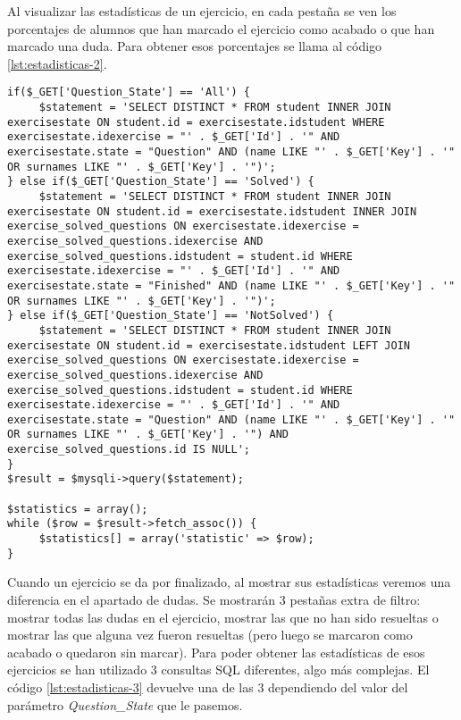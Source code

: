 Al visualizar las estadísticas de un ejercicio, en cada pestaña se ven los porcentajes de alumnos que han marcado el ejercicio como acabado o que han marcado una duda. Para obtener esos porcentajes se llama al código \ref{lst:estadisticas-2}.\\

\noindent
\begin{lstlisting}[caption={Mostrar todas las dudas, las no resueltas o las resueltas.},label={lst:estadisticas-3}]
if($_GET['Question_State'] == 'All') {
     $statement = 'SELECT DISTINCT * FROM student INNER JOIN exercisestate ON student.id = exercisestate.idstudent WHERE exercisestate.idexercise = "' . $_GET['Id'] . '" AND exercisestate.state = "Question" AND (name LIKE "' . $_GET['Key'] . '" OR surnames LIKE "' . $_GET['Key'] . '")';
} else if($_GET['Question_State'] == 'Solved') {
     $statement = 'SELECT DISTINCT * FROM student INNER JOIN exercisestate ON student.id = exercisestate.idstudent INNER JOIN exercise_solved_questions ON exercisestate.idexercise = exercise_solved_questions.idexercise AND exercise_solved_questions.idstudent = student.id WHERE exercisestate.idexercise = "' . $_GET['Id'] . '" AND exercisestate.state = "Finished" AND (name LIKE "' . $_GET['Key'] . '" OR surnames LIKE "' . $_GET['Key'] . '")';
} else if($_GET['Question_State'] == 'NotSolved') {
     $statement = 'SELECT DISTINCT * FROM student INNER JOIN exercisestate ON student.id = exercisestate.idstudent LEFT JOIN exercise_solved_questions ON exercisestate.idexercise = exercise_solved_questions.idexercise AND exercise_solved_questions.idstudent = student.id WHERE exercisestate.idexercise = "' . $_GET['Id'] . '" AND  exercisestate.state = "Question" AND (name LIKE "' . $_GET['Key'] . '" OR surnames LIKE "' . $_GET['Key'] . '") AND exercise_solved_questions.id IS NULL';
}
$result = $mysqli->query($statement);

$statistics = array();
while ($row = $result->fetch_assoc()) {
     $statistics[] = array('statistic' => $row);
}
\end{lstlisting}

Cuando un ejercicio se da por finalizado, al mostrar sus estadísticas veremos una diferencia en el apartado de dudas. Se mostrarán 3 pestañas extra de filtro: mostrar todas las dudas en el ejercicio, mostrar las que no han sido resueltas o mostrar las que alguna vez fueron resueltas (pero luego se marcaron como acabado o quedaron sin marcar). Para poder obtener las estadísticas de esos ejercicios se han utilizado 3 consultas SQL diferentes, algo más complejas. El código \ref{lst:estadisticas-3} devuelve una de las 3 dependiendo del valor del parámetro \textit{Question\_State} que le pasemos.\\

